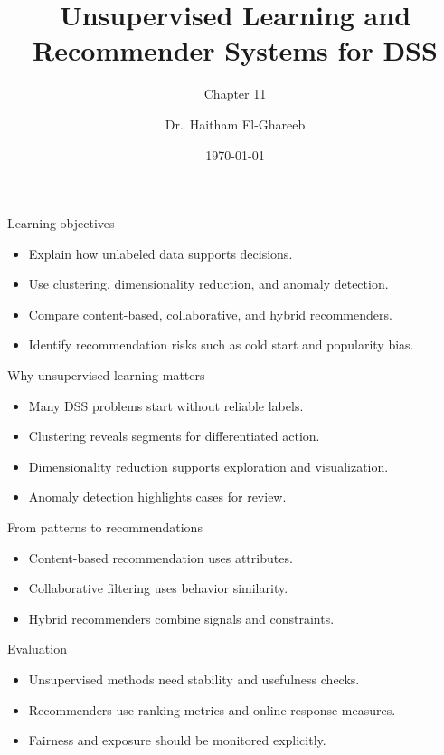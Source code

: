 \documentclass[aspectratio=169,11pt]{beamer}
\title[Unsupervised DSS]{Unsupervised Learning and Recommender Systems for DSS}
\subtitle{Chapter 11}
\author{Dr.\ Haitham El-Ghareeb}
\institute{Faculty of Computers and Information Sciences}
\date{\today}
\begin{document}
\begin{frame}
  \titlepage
\end{frame}

\begin{frame}{Learning objectives}
  \begin{itemize}
    \item Explain how unlabeled data supports decisions.
    \item Use clustering, dimensionality reduction, and anomaly detection.
    \item Compare content-based, collaborative, and hybrid recommenders.
    \item Identify recommendation risks such as cold start and popularity bias.
  \end{itemize}
\end{frame}

\begin{frame}{Why unsupervised learning matters}
  \begin{itemize}
    \item Many DSS problems start without reliable labels.
    \item Clustering reveals segments for differentiated action.
    \item Dimensionality reduction supports exploration and visualization.
    \item Anomaly detection highlights cases for review.
  \end{itemize}
\end{frame}

\begin{frame}{From patterns to recommendations}
  \begin{itemize}
    \item Content-based recommendation uses attributes.
    \item Collaborative filtering uses behavior similarity.
    \item Hybrid recommenders combine signals and constraints.
  \end{itemize}
\end{frame}

\begin{frame}{Evaluation}
  \begin{itemize}
    \item Unsupervised methods need stability and usefulness checks.
    \item Recommenders use ranking metrics and online response measures.
    \item Fairness and exposure should be monitored explicitly.
  \end{itemize}
\end{frame}
\end{document}
